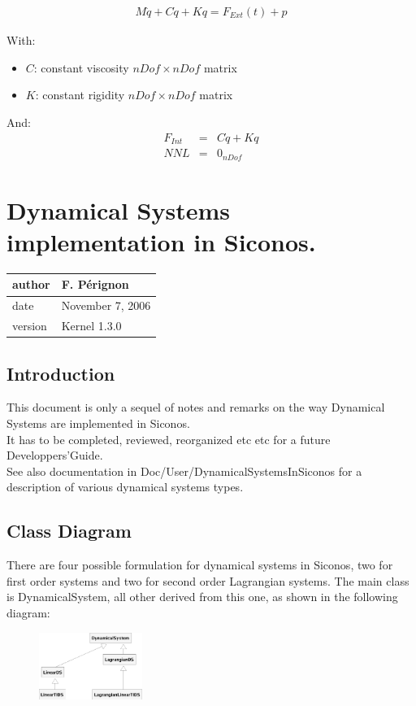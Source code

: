 \documentclass[10pt]{report}
\begin{document}
\begin{eqnarray}
M \ddot q + C \dot q + K q =  F_{Ext}(t) + p
\end{eqnarray}

With:
\begin{itemize}
\item $C$: constant viscosity $nDof\times nDof$ matrix 
\item $K$: constant rigidity $nDof\times nDof$ matrix 
\end{itemize}

And: 
\begin{eqnarray}
F_{Int} &=& C \dot q + K q \\
NNL &=& 0_{nDof} 
\end{eqnarray}



\chapter{Dynamical Systems implementation in Siconos.}

\begin{table}[!ht]
  \begin{tabular}{|l|l|}
    \hline
    author  & F.  P\'erignon \\
    \hline
    date    & November 7, 2006 \\ 
    \hline
    version & Kernel 1.3.0 \\
    \hline
  \end{tabular}
\end{table}




\section{Introduction}
This document is only a sequel of notes and remarks on the way Dynamical Systems are implemented in Siconos.\\
It has to be completed, reviewed, reorganized etc etc for a future Developpers'Guide. \\
See also documentation in Doc/User/DynamicalSystemsInSiconos for a description of various dynamical systems types.

\section{Class Diagram}
There are four possible formulation for dynamical systems in Siconos,
two for first order systems and two for second order Lagrangian systems. The main class is DynamicalSystem, all other derived from this one, as shown in the following diagram:
\begin{figure}[htbp]
  \centering
 \includegraphics[width=0.3\textwidth]{./DSClassDiagram.eps}
  \label{DSDiagram}
\end{figure}
\end{document}
